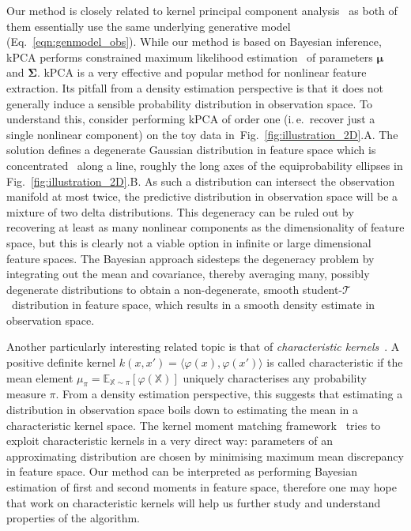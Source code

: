 \documentclass[twoside]{article}
\newcommand{\subfigref}[2]{Fig.~\ref{#1}.#2}
\newcommand{\studentt}{student-$\mathcal{T}$\ }
\newcommand{\ie}{i.\,e.\ }
\begin{document}
Our method is closely related to kernel principal component analysis~\cite[kPCA]{Scholkopf1998} as both of them essentially use the same underlying generative model (Eq.~\ref{eqn:genmodel_obs}). While our method is based on Bayesian inference, kPCA performs constrained maximum likelihood estimation~\cite{Rosipal2001} of parameters $\bm{\mu}$ and $\bm{\Sigma}$. kPCA is a very effective and popular method for nonlinear feature extraction. Its pitfall from a density estimation perspective is that it does not generally induce a sensible probability distribution in observation space. To understand this, consider performing kPCA of order one (\ie recover just a single nonlinear component) on the toy data in~\subfigref{fig:illustration_2D}{A}. The solution defines a degenerate Gaussian distribution in feature space which is concentrated~ along a line, roughly the long axes of the equiprobability ellipses in \subfigref{fig:illustration_2D}{B}. As such a distribution can intersect the observation manifold at most twice, the predictive distribution in observation space will be a mixture of two delta distributions. This degeneracy can be ruled out by recovering at least as many nonlinear components as the dimensionality of feature space, but this is clearly not a viable option in infinite or large dimensional feature spaces. The Bayesian approach sidesteps the degeneracy problem by integrating out the mean and covariance, thereby averaging many, possibly degenerate distributions to obtain a non-degenerate, smooth \studentt distribution in feature space, which results in a smooth density estimate in observation space.

Another particularly interesting related topic is that of \emph{characteristic kernels}~\cite{Sriperumbudur2008}. A positive definite kernel $k(x,x') = \langle\varphi(x),\varphi(x')\rangle$ is called characteristic if the mean element $\mu_\pi = \mathbb{E}_{\mathbb{X} \sim \pi}[\varphi(\mathbb{X})]$ uniquely characterises any probability measure $\pi$. From a density estimation perspective, this suggests that estimating a distribution in observation space boils down to estimating the mean in a characteristic kernel space. The kernel moment matching framework~\cite{Song2008} tries to exploit characteristic kernels in a very direct way: parameters of an approximating distribution are chosen by minimising maximum mean discrepancy in feature space. Our method can be interpreted as performing Bayesian estimation of first and second moments in feature space, therefore one may hope that work on characteristic kernels will help us further study and understand properties of the algorithm.
\end{document}
